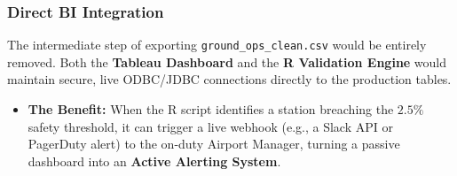 \documentclass[
  letterpaper,
  DIV=11,
  numbers=noendperiod]{scrartcl}
\providecommand{\tightlist}{%
  \setlength{\itemsep}{0pt}\setlength{\parskip}{0pt}}
\begin{document}
\subsubsection{Direct BI Integration}

The intermediate step of exporting \texttt{ground\_ops\_clean.csv} would
be entirely removed. Both the \textbf{Tableau Dashboard} and the
\textbf{R Validation Engine} would maintain secure, live ODBC/JDBC
connections directly to the production tables.

\begin{itemize}
\tightlist
\item
  \textbf{The Benefit:} When the R script identifies a station breaching
  the \(2.5\%\) safety threshold, it can trigger a live webhook (e.g., a
  Slack API or PagerDuty alert) to the on-duty Airport Manager, turning
  a passive dashboard into an \textbf{Active Alerting System}.
\end{itemize}
\end{document}

